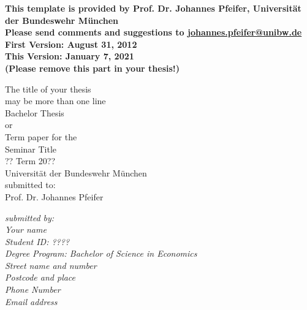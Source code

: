 \documentclass[a4paper,12pt]{scrartcl} %
\begin{document}




\begin{titlepage}

\thispagestyle{empty}   %
\begin{center}
\textbf{
This template is provided by Prof. Dr. Johannes Pfeifer, Universität der Bundeswehr München\\
Please send comments and suggestions to \href{mailto:jpfeifer@uni-koeln.de}{johannes.pfeifer@unibw.de}\\
First Version: August 31, 2012\\
This Version: January 7, 2021\\
(Please remove this part in your thesis!)
}
\end{center}


\begin{center}
\vspace*{2.cm}
{\textbf  \Large The title of your thesis\\may be more than one line} \\
\vspace*{2cm}
Bachelor Thesis\\
or\\
Term paper for the \\ Seminar Title  \\ ?? Term 20??\\
\vspace{0.5cm}
Universität der Bundeswehr München\\
\vspace*{0.5cm}
submitted to:\\
Prof. Dr. Johannes Pfeifer\\
\vspace*{0.5cm}

\end{center}


\vfill
\begin{flushright}
   \emph{submitted by:} \\
   \emph{Your name} \\
   \emph{Student ID: ????}\\
    \emph{Degree Program: Bachelor of Science in Economics}\\
   \vspace*{0.5cm}
    \emph{Street name and number}\\
    \emph{Postcode and place}\\
   \emph{Phone Number}\\
   \emph{Email address}\\
\end{flushright}


\end{titlepage}
\end{document}
